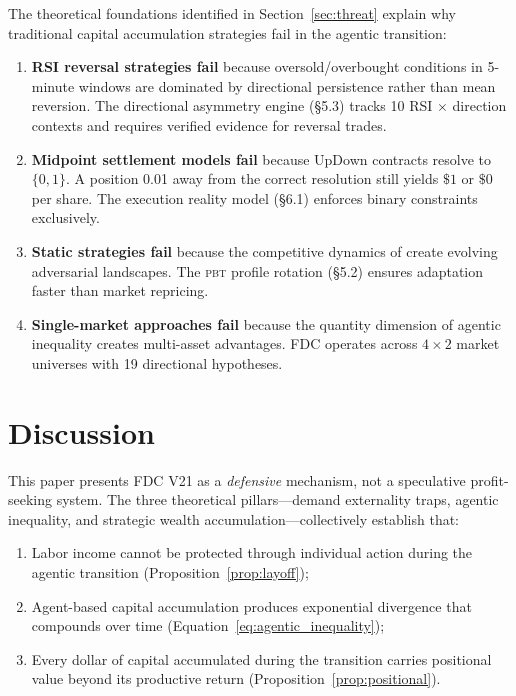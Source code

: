 \documentclass[11pt,a4paper]{article}
\newcommand{\pbt}{\textsc{pbt}}
\begin{document}
The theoretical foundations identified in Section~\ref{sec:threat} explain why traditional capital accumulation strategies fail in the agentic transition:

\begin{enumerate}
    \item \textbf{RSI reversal strategies fail} because oversold/overbought conditions in 5-minute windows are dominated by directional persistence rather than mean reversion. The directional asymmetry engine (\S5.3) tracks 10 RSI $\times$ direction contexts and requires verified evidence for reversal trades.

    \item \textbf{Midpoint settlement models fail} because UpDown contracts resolve to $\{0, 1\}$. A position 0.01 away from the correct resolution still yields $\$1$ or $\$0$ per share. The execution reality model (\S6.1) enforces binary constraints exclusively.

    \item \textbf{Static strategies fail} because the competitive dynamics of \citet{hemenway2026ai} create evolving adversarial landscapes. The \pbt{} profile rotation (\S5.2) ensures adaptation faster than market repricing.

    \item \textbf{Single-market approaches fail} because the quantity dimension of agentic inequality \citep{sharp2026agentic} creates multi-asset advantages. FDC operates across $4 \times 2$ market universes with 19 directional hypotheses.
\end{enumerate}

\section{Discussion}

This paper presents FDC V21 as a \emph{defensive} mechanism, not a speculative profit-seeking system. The three theoretical pillars---demand externality traps, agentic inequality, and strategic wealth accumulation---collectively establish that:

\begin{enumerate}
    \item Labor income cannot be protected through individual action during the agentic transition (Proposition~\ref{prop:layoff});
    \item Agent-based capital accumulation produces exponential divergence that compounds over time (Equation~\ref{eq:agentic_inequality});
    \item Every dollar of capital accumulated during the transition carries positional value beyond its productive return (Proposition~\ref{prop:positional}).
\end{enumerate}
\end{document}
